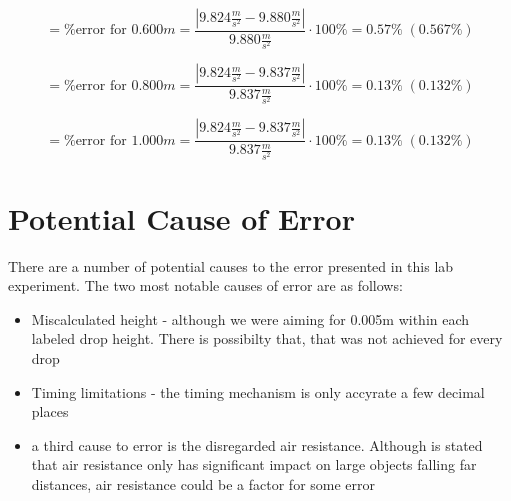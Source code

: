 \begin{equation*}
  = \text{\%error for 0.600$m$} = \frac{|9.824\frac{m}{s^2} - 9.880\frac{m}{s^2}|}{9.880\frac{m}{s^2}} \cdot 100\% = 0.57\% \; (0.567\%)
\end{equation*}

\begin{equation*}
  = \text{\%error for 0.800$m$} = \frac{|9.824\frac{m}{s^2} - 9.837\frac{m}{s^2}|}{9.837\frac{m}{s^2}} \cdot 100\% = 0.13\% \; (0.132\%)
\end{equation*}

\begin{equation*}
  = \text{\%error for 1.000$m$} = \frac{|9.824\frac{m}{s^2} - 9.837\frac{m}{s^2}|}{9.837\frac{m}{s^2}} \cdot 100\% = 0.13\% \; (0.132\%)
\end{equation*}

\section{Potential Cause of Error}
There are a number of potential causes to the error presented in this lab 
experiment. The two most notable causes of error are as follows:
\begin{itemize}
  \item Miscalculated height - although we were aiming for 0.005m within each labeled
    drop height. There is possibilty that, that was not achieved for every drop
  \item Timing limitations - the timing mechanism is only accyrate a few decimal places
  \item a third cause to error is the disregarded air resistance. Although is stated 
    that air resistance only has significant impact on large objects falling far distances,
    air resistance could be a factor for some error
\end{itemize}
    
